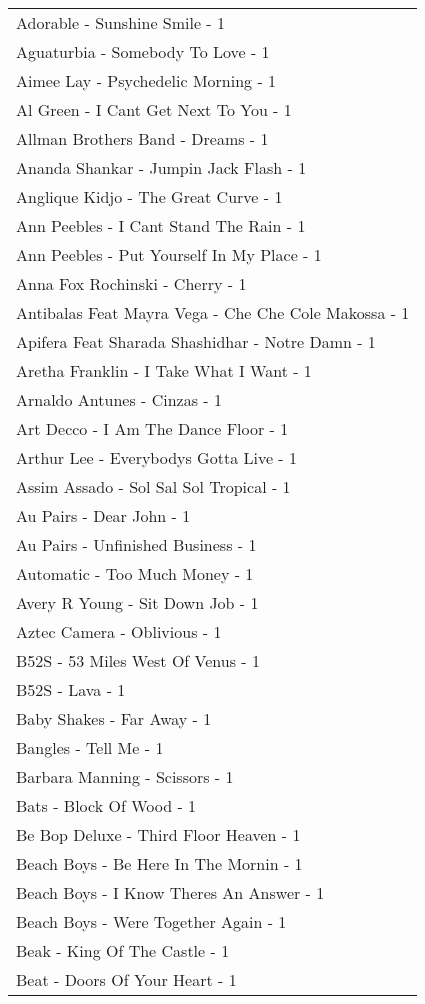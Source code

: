 \documentclass[
]{article}
\begin{document}
\begin{longtable}{l}
Adorable - Sunshine Smile - 1 \\ 
Aguaturbia - Somebody To Love - 1 \\ 
Aimee Lay - Psychedelic Morning - 1 \\ 
Al Green - I Cant Get Next To You - 1 \\ 
Allman Brothers Band - Dreams - 1 \\ 
Ananda Shankar - Jumpin Jack Flash - 1 \\ 
Anglique Kidjo - The Great Curve - 1 \\ 
Ann Peebles - I Cant Stand The Rain - 1 \\ 
Ann Peebles - Put Yourself In My Place - 1 \\ 
Anna Fox Rochinski - Cherry - 1 \\ 
Antibalas Feat Mayra Vega - Che Che Cole Makossa - 1 \\ 
Apifera Feat Sharada Shashidhar - Notre Damn - 1 \\ 
Aretha Franklin - I Take What I Want - 1 \\ 
Arnaldo Antunes - Cinzas - 1 \\ 
Art Decco - I Am The Dance Floor - 1 \\ 
Arthur Lee - Everybodys Gotta Live - 1 \\ 
Assim Assado - Sol Sal Sol Tropical - 1 \\ 
Au Pairs - Dear John - 1 \\ 
Au Pairs - Unfinished Business - 1 \\ 
Automatic - Too Much Money - 1 \\ 
Avery R Young - Sit Down Job - 1 \\ 
Aztec Camera - Oblivious - 1 \\ 
B52S - 53 Miles West Of Venus - 1 \\ 
B52S - Lava - 1 \\ 
Baby Shakes - Far Away - 1 \\ 
Bangles - Tell Me - 1 \\ 
Barbara Manning - Scissors - 1 \\ 
Bats - Block Of Wood - 1 \\ 
Be Bop Deluxe - Third Floor Heaven - 1 \\ 
Beach Boys - Be Here In The Mornin - 1 \\ 
Beach Boys - I Know Theres An Answer - 1 \\ 
Beach Boys - Were Together Again - 1 \\ 
Beak - King Of The Castle - 1 \\ 
Beat - Doors Of Your Heart - 1 \\ 

\end{longtable}
\end{document}
